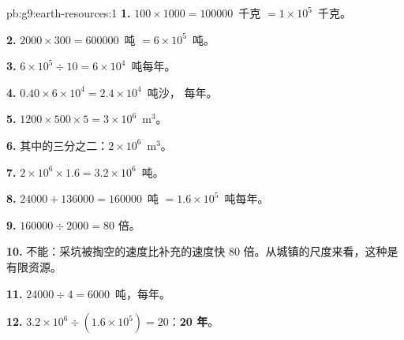 \begin{solution}{pb:g9:earth-resources:1}
\textbf{1.} $100 \times 1000 = \num{100000}$~千克 $= 1 \times 10^5$~千克。

\textbf{2.} $2000 \times 300 = \num{600000}$~吨 $= 6 \times 10^5$~吨。

\textbf{3.} $6 \times 10^5 \div 10 = 6 \times 10^4$~吨每年。

\textbf{4.} $0.40 \times 6 \times 10^4 = 2.4 \times 10^4$~吨沙，
每年。

\textbf{5.} $1200 \times 500 \times 5 = 3 \times 10^6$~m$^3$。

\textbf{6.} 其中的三分之二：$2 \times 10^6$~m$^3$。

\textbf{7.} $2 \times 10^6 \times 1.6 = 3.2 \times 10^6$~吨。

\textbf{8.} $\num{24000} + \num{136000} = \num{160000}$~吨 $= 1.6 \times
10^5$~吨每年。

\textbf{9.} $\num{160000} \div 2000 = 80$ 倍。

\textbf{10.} 不能：采坑被掏空的速度比补充的速度快
80 倍。从城镇的尺度来看，这种是有限资源。

\textbf{11.} $\num{24000} \div 4 = \num{6000}$~吨，每年。

\textbf{12.} $3.2 \times 10^6 \div (1.6 \times 10^5) = 20$：\textbf{20 年}。
\end{solution}
